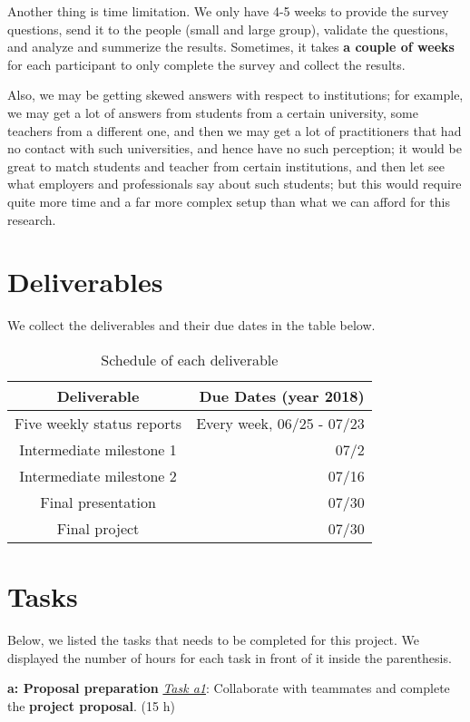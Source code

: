 \documentclass{sigchi}
\begin{document}
 Another thing is time limitation. We only have 4-5 weeks to provide the survey questions, send it to the people (small and large group), validate the questions, and analyze and summerize the results. Sometimes, it takes \textbf{a couple of weeks} for each participant to only complete the survey and collect the results.
 
 Also, we may be getting skewed answers with respect to institutions; for example, we may get a lot of answers from students from a certain university, some teachers from a different one, and then we may get a lot of practitioners that had no contact with such universities, and hence have no such perception; it would be great to match students and teacher from certain institutions, and then let see what employers and professionals say about such students; but this would require quite more time and a far more complex setup than what we can afford for this research.
 
  
 \section{Deliverables}
 We collect the deliverables and their due dates in the table below.
 
 \begin{table}[H]
 \centering
 \begin{tabular}{c r} 					%
 \hline\hline						%
 Deliverable & Due Dates (year 2018)\\
 \hline
 Five weekly status reports & Every week, 06/25 - 07/23\\
 Intermediate milestone 1 & 07/2\\
 Intermediate milestone 2 & 07/16\\
 Final presentation & 07/30\\
 Final project & 07/30\\
 \hline
 \end{tabular}
 \caption{Schedule of each deliverable} 	%
 \end{table}
	  
   
  \section{Tasks}
  Below, we listed the tasks that needs to be completed for this project. We displayed the number of hours for each task in front of it inside the parenthesis.\newline

\textbf{a: Proposal preparation}\newline
\textit{\underline{Task a1}}: Collaborate with teammates and complete the \textbf{project proposal}. (15 h)\newline
\end{document}
